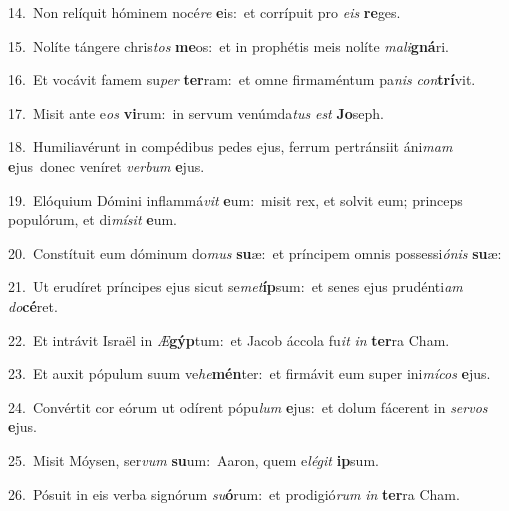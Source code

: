 {\numbfont\textcolor{\numbcolor}{14.}}~Non relíquit hóminem nocé\textit{re} \textbf{e}\-is:~\star et corrípuit pro \textit{e}\-\textit{is} \textbf{re}\-ges.\par
{\numbfont\textcolor{\numbcolor}{15.}}~Nolíte tángere chris\textit{tos} \textbf{me}\-os:~\star et in prophétis meis nolíte \textit{ma}\-\textit{li}\textbf{gná}ri.\par
{\numbfont\textcolor{\numbcolor}{16.}}~Et vocávit famem su\textit{per} \textbf{ter}\-ram:~\star et omne firmaméntum pa\textit{nis} \textit{con}\-\textbf{trí}vit.\par
{\numbfont\textcolor{\numbcolor}{17.}}~Misit ante e\textit{os} \textbf{vi}\-rum:~\star in servum venúmda\textit{tus} \textit{est} \textbf{Jo}\-seph.\par
{\numbfont\textcolor{\numbcolor}{18.}}~Humiliavérunt in compédibus pedes ejus, ferrum pertránsiit áni\textit{mam} \textbf{e}\-jus~\star donec veníret \textit{ver}\-\textit{bum} \textbf{e}\-jus.\par
{\numbfont\textcolor{\numbcolor}{19.}}~Elóquium Dómini inflammá\textit{vit} \textbf{e}\-um:~\star misit rex, et solvit eum; princeps populórum, et di\-\textit{mí}\-\textit{sit} \textbf{e}\-um.\par
{\numbfont\textcolor{\numbcolor}{20.}}~Constítuit eum dóminum do\textit{mus} \textbf{su}\-æ:~\star et príncipem omnis possessi\-\textit{ó}\-\textit{nis} \textbf{su}\-æ:\par
{\numbfont\textcolor{\numbcolor}{21.}}~Ut erudíret príncipes ejus sicut se\-\textit{met}\-\textbf{íp}sum:~\star et senes ejus prudénti\textit{am} \textit{do}\-\textbf{cé}ret.\par
{\numbfont\textcolor{\numbcolor}{22.}}~Et intrávit Israël in \textit{Æ}\-\textbf{gýp}tum:~\star et Jacob áccola fu\textit{it} \textit{in} \textbf{ter}\-ra Cham.\par
{\numbfont\textcolor{\numbcolor}{23.}}~Et auxit pópulum suum ve\-\textit{he}\-\textbf{mén}ter:~\star et firmávit eum super ini\-\textit{mí}\-\textit{cos} \textbf{e}\-jus.\par
{\numbfont\textcolor{\numbcolor}{24.}}~Convértit cor eórum ut odírent pópu\textit{lum} \textbf{e}\-jus:~\star et dolum fácerent in \textit{ser}\-\textit{vos} \textbf{e}\-jus.\par
{\numbfont\textcolor{\numbcolor}{25.}}~Misit Móysen, ser\textit{vum} \textbf{su}\-um:~\star Aaron, quem e\-\textit{lé}\-\textit{git} \textbf{ip}\-sum.\par
{\numbfont\textcolor{\numbcolor}{26.}}~Pósuit in eis verba signórum \textit{su}\-\textbf{ó}rum:~\star et prodigió\textit{rum} \textit{in} \textbf{ter}\-ra Cham.\par
